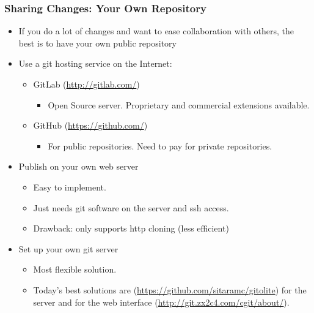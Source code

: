 \begin{frame}
  \frametitle{Sharing Changes: Your Own Repository}
  \begin{itemize}
  \item If you do a lot of changes and want to ease collaboration with
    others, the best is to have your own public repository
  \item Use a git hosting service on the Internet:
    \begin{itemize}
    \item GitLab (\url{http://gitlab.com/})
      \begin{itemize}
      \item Open Source server. Proprietary and commercial extensions
       available.
      \end{itemize}
    \item GitHub (\url{https://github.com/})
      \begin{itemize}
      \item For public repositories. Need to pay for private
        repositories.
      \end{itemize}
    \end{itemize}
  \item Publish on your own web server
    \begin{itemize}
    \item Easy to implement.
    \item Just needs git software on the server and ssh access.
    \item Drawback: only supports http cloning (less efficient)
    \end{itemize}
  \item Set up your own git server
    \begin{itemize}
    \item Most flexible solution.
    \item Today's best solutions are 
      (\url{https://github.com/sitaramc/gitolite}) for the server and
       for the web interface
      (\url{http://git.zx2c4.com/cgit/about/}).
    \end{itemize}
  \end{itemize}
\end{frame}

